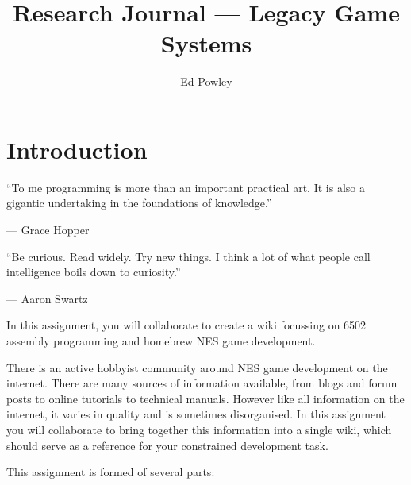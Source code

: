 \documentclass{../../fal_assignment}
\title{Research Journal --- Legacy Game Systems}
\author{Ed Powley}
\begin{document}
\maketitle

\section*{Introduction}

\begin{marginquote}
  ``To me programming is more than an important practical art. It is also a gigantic undertaking in the foundations of knowledge.''
    
    --- Grace Hopper
    
    \marginquoterule
    
    ``Be curious. Read widely. Try new things. I think a lot of what people call intelligence boils down to curiosity.''
    
    --- Aaron Swartz
            
\end{marginquote}

In this assignment, you will collaborate to create a wiki focussing on 6502 assembly programming and homebrew NES game development.

There is an active hobbyist community around NES game development on the internet.
There are many sources of information available,
from blogs and forum posts to online tutorials to technical manuals.
However like all information on the internet, it varies in quality and is sometimes disorganised.
In this assignment you will collaborate to bring together this information into a single wiki,
which should serve as a reference for your constrained development task.

This assignment is formed of several parts:
\end{document}
